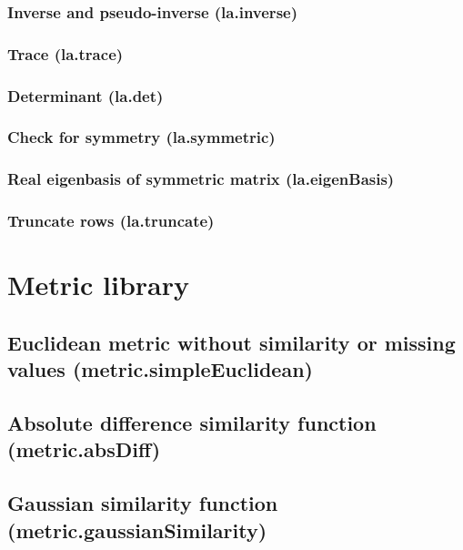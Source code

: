 \documentclass{article}
\theoremstyle{definition}
\begin{document}
\subsubsection{Inverse and pseudo-inverse (la.inverse)}

\subsubsection{Trace (la.trace)}

\subsubsection{Determinant (la.det)}

\subsubsection{Check for symmetry (la.symmetric)}

\subsubsection{Real eigenbasis of symmetric matrix (la.eigenBasis)}

\subsubsection{Truncate rows (la.truncate)}

\pagebreak

\section{Metric library}

\subsection{Euclidean metric without similarity or missing values (metric.simpleEuclidean)}

\subsection{Absolute difference similarity function (metric.absDiff)}

\subsection{Gaussian similarity function (metric.gaussianSimilarity)}
\end{document}
